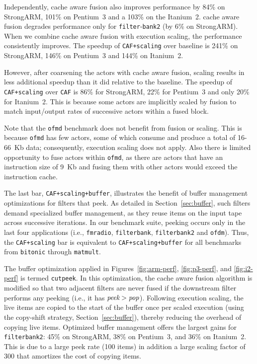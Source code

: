Independently, cache aware fusion also improves performance by 84\% on
StrongARM, 101\% on Pentium~3 and a 103\% on the Itanium~2.
cache aware fusion degrades performance only for
\texttt{filter}-\texttt{bank2} (by 6\% on StrongARM). When we combine
cache aware fusion with execution scaling, the performance
consistently improves.  The speedup of \texttt{CAF+scaling} over
baseline is 241\% on StrongARM, 146\% on Pentium~3 and 144\% on
Itanium~2.

However, after coarsening the actors with cache aware fusion, scaling
results in less additional speedup than it did relative to the
baseline.  The speedup of \texttt{CAF+scaling} over \texttt{CAF} is
86\% for StrongARM, 22\% for Pentium~3 and only 20\% for Itanium~2.
This is because some actors are implicitly scaled by fusion to match
input/output rates of successive actors within a fused block.

Note that the \texttt{ofmd} benchmark does not benefit from fusion or
scaling. This is because \texttt{ofmd} has few actors, some of which
consume and produce a total of 16-66~Kb data; consequently, execution
scaling does not apply.  Also there is limited opportunity to fuse
actors within \texttt{ofmd}, as there are actors that have an
instruction size of 9~Kb and fusing them with other actors would
exceed the instruction cache.

The last bar, {\tt CAF+scaling+buffer}, illustrates the benefit of
buffer management optimizations for filters that peek.  As detailed in
Section~\ref{sec:buffer}, such filters demand specialized buffer
management, as they reuse items on the input tape across successive
iterations.  In our benchmark suite, peeking occurs only in the last
four applications (i.e., \texttt{fmradio}, \texttt{filterbank},
\texttt{filterbank2} and \texttt{ofdm}).  Thus, the {\tt CAF+scaling}
bar is equivalent to {\tt CAF+scaling+buffer} for all benchmarks from
{\tt bitonic} through {\tt matmult}.

The buffer optimization applied in Figures~\ref{fig:arm-perf},
\ref{fig:p3-perf}, and \ref{fig:i2-perf} is termed {\tt cutpeek}.  In
this optimization, the cache aware fusion algorithm is modified so
that two adjacent filters are never fused if the downstream filter
performs any peeking (i.e., it has $\mbox{\it peek} > \mbox{\it
pop}$).  Following execution scaling, the live items are copied to the
start of the buffer once per scaled execution (using the copy-shift
strategy, Section~\ref{sec:buffer}), thereby reducing the overhead
of copying live items.  Optimized buffer management offers the largest
gains for {\tt filterbank2}: 45\% on StrongARM, 38\% on Pentium~3, and
36\% on Itanium~2.  This is due to a large peek rate (100 items) in
addition a large scaling factor of 300 that amortizes the cost of
copying items.

